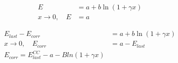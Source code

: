 \documentclass[letterpaper, 12pt]{article}
\begin{document}
\begin{align*}
E&= a+b \ln(1+\gamma x)\\
x \rightarrow 0,\quad E &= a
\end{align*}

\begin{align*}
E_{last} - E_{corr}&= a+b \ln(1+\gamma x)\\
x \rightarrow 0, \quad E_{corr} &= a - E_{last}\\
E_{corr} =  E^{CC}_{last} - a- B ln(1+\gamma x)
\end{align*}
\end{document}
